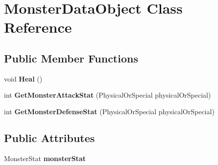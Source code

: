 \hypertarget{class_monster_data_object}{\section{Monster\-Data\-Object Class Reference}
\label{class_monster_data_object}
}
\subsection*{Public Member Functions}
\begin{DoxyCompactItemize}
\item 
\hypertarget{class_monster_data_object_ae98ad166b3e39dcf0dbb5f536bf26e75}{void {\bfseries Heal} ()}\label{class_monster_data_object_ae98ad166b3e39dcf0dbb5f536bf26e75}

\item 
\hypertarget{class_monster_data_object_a9145305fbb393ee4dc8c1b67fcad6761}{int {\bfseries Get\-Monster\-Attack\-Stat} (Physical\-Or\-Special physical\-Or\-Special)}\label{class_monster_data_object_a9145305fbb393ee4dc8c1b67fcad6761}

\item 
\hypertarget{class_monster_data_object_a587fff4654429213fd8d33df977b9be8}{int {\bfseries Get\-Monster\-Defense\-Stat} (Physical\-Or\-Special physical\-Or\-Special)}\label{class_monster_data_object_a587fff4654429213fd8d33df977b9be8}

\end{DoxyCompactItemize}
\subsection*{Public Attributes}
\begin{DoxyCompactItemize}
\item 
\hypertarget{class_monster_data_object_a32f219c168636419992aa379f59c9ff0}{Monster\-Stat {\bfseries monster\-Stat}}\label{class_monster_data_object_a32f219c168636419992aa379f59c9ff0}

\end{DoxyCompactItemize}
